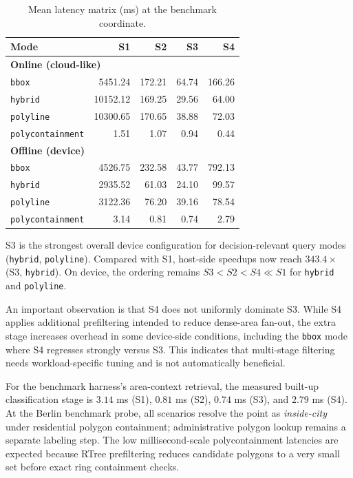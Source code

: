 \documentclass[conference]{IEEEtran}
\begin{document}
\begin{table}[!t]
\caption{Mean latency matrix (\si{\milli\second}) at the benchmark coordinate.}
\label{tab:bench_joint}
\centering
\footnotesize
\setlength{\tabcolsep}{3pt}
\begin{tabular}{lrrrr}
\toprule
Mode & S1 & S2 & S3 & S4 \\
\midrule
\multicolumn{5}{l}{\textbf{Online (cloud-like)}} \\
\texttt{bbox}     & 5451.24 & 172.21 & 64.74 & 166.26 \\
\texttt{hybrid}   & 10152.12 & 169.25 & 29.56 & 64.00 \\
\texttt{polyline} & 10300.65 & 170.65 & 38.88 & 72.03 \\
\texttt{polycontainment} & 1.51 & 1.07 & 0.94 & 0.44 \\
\midrule
\multicolumn{5}{l}{\textbf{Offline (device)}} \\
\texttt{bbox}     & 4526.75 & 232.58 & 43.77 & 792.13 \\
\texttt{hybrid}   & 2935.52 & 61.03 & 24.10 & 99.57 \\
\texttt{polyline} & 3122.36 & 76.20 & 39.16 & 78.54 \\
\texttt{polycontainment} & 3.14 & 0.81 & 0.74 & 2.79 \\
\bottomrule
\end{tabular}
\end{table}

S3 is the strongest overall device configuration for decision-relevant query modes (\texttt{hybrid}, \texttt{polyline}). Compared with S1, host-side speedups now reach \(343.4\times\) (S3, \texttt{hybrid}). On device, the ordering remains \(S3 < S2 < S4 \ll S1\) for \texttt{hybrid} and \texttt{polyline}.

An important observation is that S4 does not uniformly dominate S3. While S4 applies additional prefiltering intended to reduce dense-area fan-out, the extra stage increases overhead in some device-side conditions, including the \texttt{bbox} mode where S4 regresses strongly versus S3. This indicates that multi-stage filtering needs workload-specific tuning and is not automatically beneficial.

For the benchmark harness's area-context retrieval, the measured built-up classification stage is \(3.14\) ms (S1), \(0.81\) ms (S2), \(0.74\) ms (S3), and \(2.79\) ms (S4). At the Berlin benchmark probe, all scenarios resolve the point as \emph{inside-city} under residential polygon containment; administrative polygon lookup remains a separate labeling step. The low millisecond-scale polycontainment latencies are expected because RTree prefiltering reduces candidate polygons to a very small set before exact ring containment checks.
\end{document}
